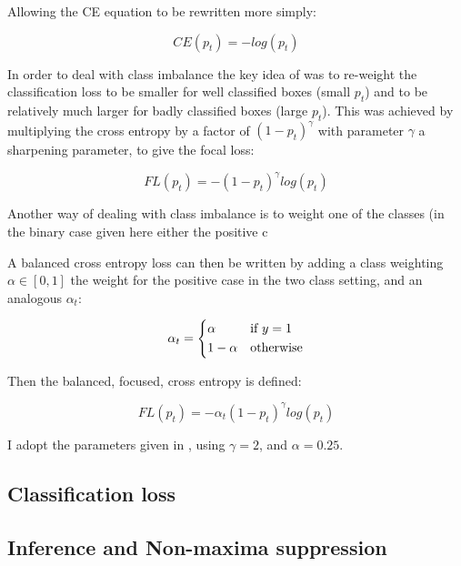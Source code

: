 Allowing the \gls{CE} equation to be rewritten more simply:

\begin{equation}
CE(p_t) = -log(p_t)
\label{eq:short_cross_entropy}
\end{equation}


In order to deal with class imbalance the key idea of \cite{Lin2017} was to re-weight the classification loss to be smaller for well classified boxes (small $p_t$) and to be relatively much larger for badly classified boxes (large $p_t$). This was achieved by multiplying the cross entropy by a factor of $(1 - p_t)^\gamma $ with parameter $\gamma$ a sharpening parameter, to give the focal loss:

\begin{equation}
FL(p_t) = - (1 - p_t)^\gamma log(p_t)
\label{eq:focal_loss_p}
\end{equation}

Another way of dealing with class imbalance is to weight one of the classes (in the binary case given here either the positive c

A balanced cross entropy loss can then be written by adding a class weighting $\alpha \in \left[0, 1\right]$ the weight for the positive case in the two class setting, and an analogous $\alpha_t$:

\begin{equation}
\alpha_t = 
  \begin{cases*}
  \alpha & if $y = 1$\\
  1 - \alpha & otherwise\\
  \end{cases*}
\label{eq:balanced_weight}
\end{equation}

Then the balanced, focused, cross entropy is defined:

\begin{equation}
FL(p_t) = -\alpha_t (1 - p_t)^\gamma log(p_t)
\label{eq:focal_loss}
\end{equation}


I adopt the parameters given in \cite{Lin2017}, using $ \gamma = 2 $, and $ \alpha = 0.25 $.


\subsection{Classification loss}


\subsection{Inference and Non-maxima suppression}


